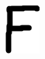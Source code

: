 \documentclass[russian,utf8,emptystyle]{eskdtext}
\begin{document}
\begin{figure}[!htb]
\includegraphics[width=\linewidth]{../data/learn/f/001}
\endminipage\hfill
{}

\end{figure}
\end{document}
